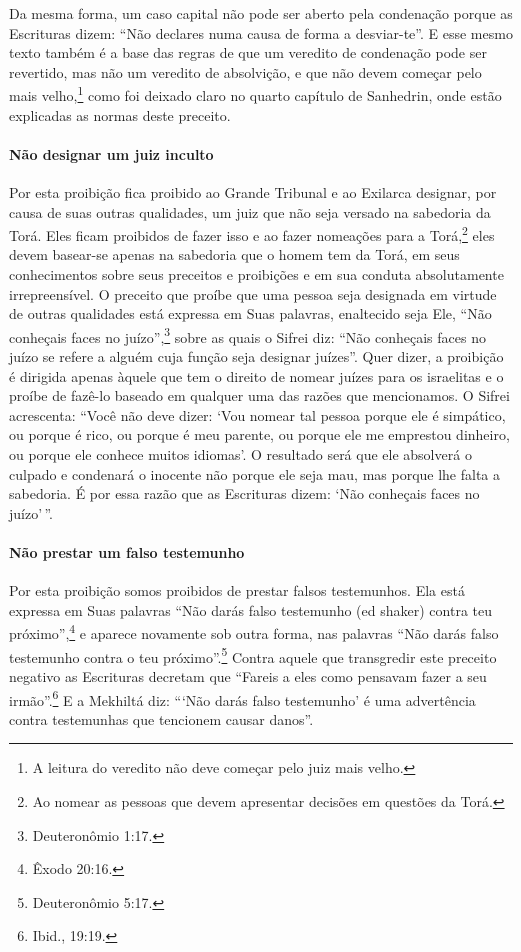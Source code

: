 Da mesma forma, um caso capital não pode ser aberto pela condenação
porque as Escrituras dizem: ``Não declares numa causa de forma a
desviar-te''. E esse mesmo texto também é a base das regras de que um
veredito de condenação pode ser revertido, mas não um veredito de
absolvição, e que não devem começar pelo mais
velho,\footnote{A leitura do veredito não deve começar pelo juiz mais velho.} como foi deixado claro no quarto capítulo
de Sanhedrin, onde estão explicadas as normas deste preceito.

\paragraph{Não designar um juiz inculto}

Por esta proibição fica proibido ao Grande Tribunal e ao Exilarca
designar, por causa de suas outras qualidades, um juiz que não seja
versado na sabedoria da Torá. Eles ficam proibidos de fazer isso e ao
fazer nomeações para a Torá,\footnote{Ao nomear as pessoas que devem apresentar decisões em questões da Torá.} eles devem basear-se
apenas na sabedoria que o homem tem da Torá, em seus conhecimentos
sobre seus preceitos e proibições e em sua conduta absolutamente
irrepreensível. O preceito que proíbe que uma pessoa seja designada em
virtude de outras qualidades está expressa em Suas palavras, enaltecido
seja Ele, ``Não conheçais faces no juízo'',\footnote{Deuteronômio 1:17.} sobre
as quais o Sifrei diz: ``Não conheçais faces no juízo se refere a alguém
cuja função seja designar juízes''. Quer dizer, a proibição é dirigida
apenas àquele que tem o direito de nomear juízes para os israelitas e o
proíbe de fazê-lo baseado em qualquer uma das razões que mencionamos. O
Sifrei acrescenta: ``Você não deve dizer: `Vou nomear tal pessoa porque
ele é simpático, ou porque é rico, ou porque é meu parente, ou porque
ele me emprestou dinheiro, ou porque ele conhece muitos idiomas'. O
resultado será que ele absolverá o culpado e condenará o inocente não
porque ele seja mau, mas porque lhe falta a sabedoria. É por essa razão
que as Escrituras dizem: `Não conheçais faces no juízo'\,''.

\paragraph{Não prestar um falso testemunho}

Por esta proibição somos proibidos de prestar falsos testemunhos. Ela
está expressa em Suas palavras ``Não darás falso testemunho (ed shaker)
contra teu próximo'',\footnote{Êxodo 20:16.} e aparece novamente sob outra
forma, nas palavras ``Não darás falso testemunho contra o teu próximo''.\footnote{Deuteronômio 5:17.} Contra aquele que transgredir este preceito
negativo as Escrituras decretam que ``Fareis a eles como pensavam fazer
a seu irmão''.\footnote{Ibid., 19:19.} E a Mekhiltá diz: ```Não darás falso
testemunho' é uma advertência contra testemunhas que tencionem causar
danos''.

